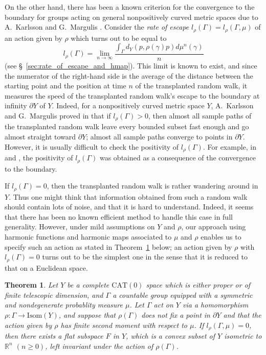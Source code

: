 \documentclass[12pt]{amsart}
\numberwithin{equation}{section}
\theoremstyle{plain}
\newtheorem{Main}{Theorem}
\theoremstyle{definition}
\theoremstyle{remark}
\newcommand{\R}{{\mathbb R}}
\newcommand{\isom}[1]{\mathrm{Isom}({#1})}
\newcommand{\cat}[1]{\mathrm{CAT}(#1)}
\begin{document}
On the other hand, there has been a known criterion for the
convergence to the boundary for groups acting on general nonpositively
curved metric spaces due to A.~Karlsson and G.~Margulis
\cite{karlsson-margulis}.
Consider the {\it rate of escape}
$l_{\rho}(\Gamma)=l_{\rho}(\Gamma,\mu)$ of an action given by $\rho$
which turns out to be equal to 
\begin{equation*}
 l_{\rho}(\Gamma) = \lim_{n\to \infty} 
  \frac{\int_{\Gamma} d_Y(p,\rho(\gamma)p) d\mu^n(\gamma)}{n}
\end{equation*}
(see \S~\ref{sec:rate_of_escape_and_hmap}). 
This limit is known to exist, and since the numerator of the right-hand
side is the average of the distance between the starting point and the
position at time $n$ of the transplanted random walk, it measures the
speed of the transplanted random walk's escape to the boundary at
infinity $\partial Y$ of $Y$.
Indeed, for a nonpositively curved metric space $Y$, 
A.~Karlsson and G.~Margulis proved in \cite{karlsson-margulis} that if
$l_{\rho}(\Gamma)>0$, then 
almost all sample paths of the transplanted random walk
leave every bounded subset fast enough and go almost straight toward
$\partial Y$; 
almost all sample paths converge to points in $\partial Y$.
However, it is usually difficult to check the positivity of
$l_{\rho}(\Gamma)$. For example, in
\cite{fernos-lecureux-matheus} and \cite{maher-tiozzo}, the positivity
of $l_{\rho}(\Gamma)$ was obtained as a consequence of the convergence
to the boundary.

If $l_{\rho}(\Gamma)=0$, then the transplanted random
walk is rather wandering around in $Y$.  
Thus one might think that information obtained from such a random
walk should contain lots of noise, and that it is hard to
understand.  
Indeed, it seems that there has been no known efficient method to handle 
this case in full generality.
However, under mild assumptions on $Y$ and $\rho$, our approach using 
harmonic functions and harmonic maps associated to $\mu$ and $\rho$
enables us to specify such an action as stated in
Theorem~\ref{thm:main-1} below; an action given by $\rho$ with
$l_{\rho}(\Gamma)=0$ turns out to be the simplest one in the sense that
it is reduced to that on a Euclidean space. 

\begin{Main}
\label{thm:main-1}
 Let $Y$ be a complete $\cat{0}$ space which is either proper or
 of finite telescopic dimension, 
 and $\Gamma$ a countable group equipped with a symmetric and 
 nondegenerate probablity measure $\mu$.
 Let $\Gamma$ act on $Y$ via a homomorphism 
 $\rho\colon \Gamma \rightarrow \isom{Y}$, and 
 suppose that $\rho(\Gamma)$ does not fix a point in 
 $\partial Y$ and that the action given by $\rho$ has finite
 second moment with respect to $\mu$.  
 If  $l_{\rho}(\Gamma,\mu)=0$, then there exists a flat subspace $F$ in
 $Y$, which is a convex subset of $Y$ isometric to $\R^n$ $(n\geq 0)$,
 left invariant under the action of $\rho(\Gamma)$. 
\end{Main}
\end{document}
